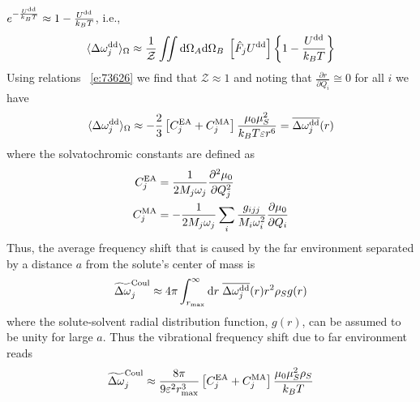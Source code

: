 \documentclass[a4paper,titlepage,twoside,fleqn,12pt]{book}
\newcommand{\fderiv}[2]{\ensuremath{
\frac{\partial #1}{\partial #2}}}
\newcommand{\sderiv}[2]{\ensuremath{
\frac{\partial^2 #1}{\partial #2^2}
}}
\begin{document}
\begin{refsection}
$e^{-\frac{U^{\rm dd}}{k_BT}}\approx 1 -\frac{U^{\rm dd}}{k_BT}$, i.e.,
%
\begin{equation}
 \langle \Delta \omega_j^{\rm dd} \rangle_{\Omega} \approx 
\frac{1}{\mathcal{Z}} 
\iint {\rm d}\Omega_A{\rm d}\Omega_B \; \left[\hat{F}_j U^{\rm dd}\right]
\left\{ 1 - \frac{U^{\rm dd}}{k_BT}\right\}
\end{equation}
%
Using relations ~\eqref{e:73626} we find that $\mathcal{Z}\approx1$
and noting that $\fderiv{r}{Q_i} \cong 0$ for all $i$ we have
%
\begin{equation}
 \langle \Delta \omega_j^{\rm dd} \rangle_{\Omega} \approx 
-\frac{2}{3} \left[ C^{\rm EA}_j + C^{\rm MA}_j \right] \frac{\mu_0\mu_S^2}{k_BT\varepsilon r^6} 
= \overline{\Delta \omega_j^{\rm dd}}(r)
\end{equation}
%
where the solvatochromic constants are defined as
%
\begin{subequations}
\begin{align}
 C^{\rm EA}_j &= \frac{1}{2M_j\omega_j} \sderiv{\mu_0}{Q_j} \\
 C^{\rm MA}_j &=-\frac{1}{2M_j\omega_j} \sum_i \frac{g_{ijj}}{M_i\omega_i^2} \fderiv{\mu_0}{Q_i}
\end{align}
\end{subequations}
%
Thus, the average frequency shift that is caused
by the far environment separated by a distance $a$
from the solute's center of mass is
%
\begin{equation}
\widetilde{\Delta \omega}_j^{\rm Coul} \approx
4\pi \int_{r_{\rm max}}^{\infty} {\rm d}r \; \overline{\Delta \omega_j^{\rm dd}}(r) r^2 \rho_S g(r)
\end{equation}
%
where the solute\hyp{}solvent radial distribution function, $g(r)$, 
can be assumed to be unity for large $a$. Thus the vibrational
frequency shift due to far environment reads
%
\begin{equation} \label{e:x123}
  \widetilde{\Delta \omega}_j^{\rm Coul}  \approx 
\frac{8\pi}{9\varepsilon^2 r_{\rm max}^3} \left[ C^{\rm EA}_j + C^{\rm MA}_j \right] \frac{\mu_0\mu_S^2\rho_S}{k_BT} 
\end{equation}
%
%

\end{refsection}
\end{document}

